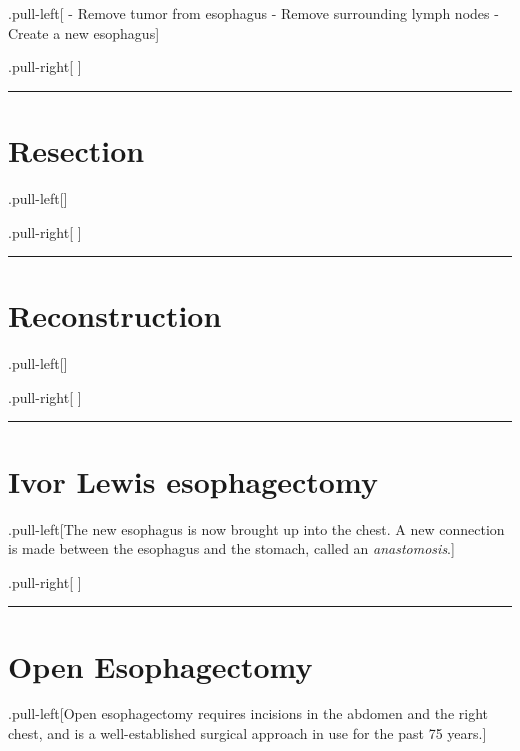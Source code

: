 \documentclass[
]{article}
\begin{document}
.pull-left{[} - Remove tumor from esophagus - Remove surrounding lymph
nodes - Create a new esophagus{]}

.pull-right{[} {]}

\begin{center}\rule{0.5\linewidth}{0.5pt}\end{center}

\hypertarget{resection}{%
\section{Resection}\label{resection}}

.pull-left{[}{]}

.pull-right{[} {]}

\begin{center}\rule{0.5\linewidth}{0.5pt}\end{center}

\hypertarget{reconstruction}{%
\section{Reconstruction}\label{reconstruction}}

.pull-left{[}{]}

.pull-right{[} {]}

\begin{center}\rule{0.5\linewidth}{0.5pt}\end{center}

\hypertarget{ivor-lewis-esophagectomy}{%
\section{Ivor Lewis esophagectomy}\label{ivor-lewis-esophagectomy}}

.pull-left{[}The new esophagus is now brought up into the chest. A new
connection is made between the esophagus and the stomach, called an
\emph{anastomosis}.{]}

.pull-right{[} {]}

\begin{center}\rule{0.5\linewidth}{0.5pt}\end{center}

\hypertarget{open-esophagectomy}{%
\section{Open Esophagectomy}\label{open-esophagectomy}}

.pull-left{[}Open esophagectomy requires incisions in the abdomen and
the right chest, and is a well-established surgical approach in use for
the past 75 years.{]}
\end{document}
